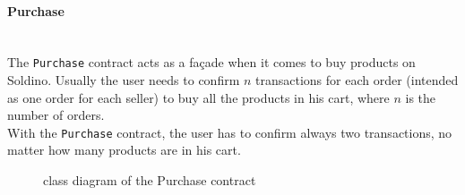 \paragraph{Purchase}\mbox{}\\ 

\noindent The \texttt{Purchase} contract acts as a façade when it comes to buy products on Soldino.
Usually the user needs to confirm $n$ transactions for each order (intended as one order for each seller) to buy all the products in his cart, where $n$ is the number of orders.\\
With the \texttt{Purchase} contract, the user has to confirm always two transactions, no matter how many products are in his cart. 
\begin{figure}[H]
	\centering
	\caption{class diagram of the Purchase contract}
\end{figure}